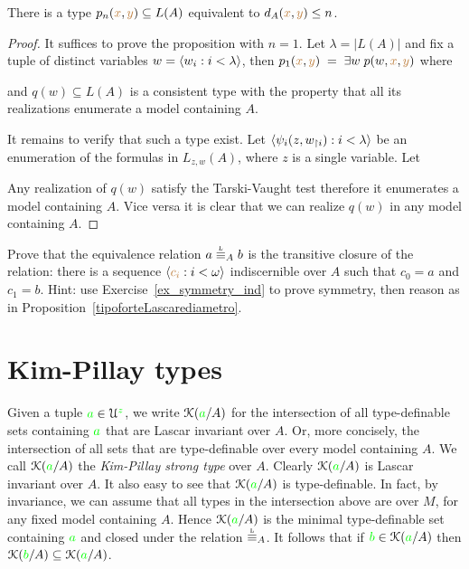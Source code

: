 \begin{proposition}\label{prop_Lascar_distance_type_def}
There is a type $p_n({\color{brown} x},{\color{brown} y})\subseteq L(A)$ equivalent to $d_A({\color{brown} x},{\color{brown} y})\le n$.  
\end{proposition}
\begin{proof}
It suffices to prove the proposition with $n=1$.
Let $\lambda=|L(A)|$ and fix a tuple of distinct variables $w=\langle w_i:i<\lambda\rangle$, then $p_1({\color{brown} x},{\color{brown} y})\;=\;\exists w\;p(w,{\color{brown} x},{\color{brown} y})$ where


and $q(w)\subseteq L(A)$ is a consistent type with the property that all its realizations enumerate a model containing $A$.

It remains to verify that such a type exist.
Let $\langle\psi_i(z,w_{\restriction i}):i<\lambda\rangle$ be an enumeration of the formulas in $L_{z,w}(A)$, where $z$ is a single variable.
Let 


Any realization of $q(w)$ satisfy the Tarski-Vaught test therefore it enumerates a model containing $A$.
Vice versa it is clear that we can realize $q(w)$ in any model containing $A$.
\end{proof}

\begin{exercise}\label{ex_Lstp_indiscernibles}
  Prove that the equivalence relation $a\stackrel{\smash{\scalebox{.5}{\rm L}}}{\equiv}_Ab$ is the transitive closure of the relation: there is a sequence $\langle{\color{brown}c_i}:i<\omega\rangle$ indiscernible over $A$ such that $c_0=a$ and $c_1=b$.
  Hint: use Exercise~\ref{ex_symmetry_ind} to prove symmetry, then reason as in Proposition~\ref{tipoforteLascarediametro}.
\end{exercise}

\section{Kim-Pillay types}\label{KPtypes}

Given a tuple ${\color{green} a}\in\EuScript U^{\color{green} z}$, we write \emph{$\EuScript K({\color{green} a}/A)$\/} for the intersection of all type-definable sets containing ${\color{green} a}$ that are Lascar invariant over $A$.
Or, more concisely, the intersection of all sets that are type-definable over every model containing $A$.
We call $\EuScript K({\color{green} a}/A)$ the \emph{Kim-Pillay strong type\/} over $A$.
Clearly $\EuScript K({\color{green} a}/A)$ is Lascar invariant over $A$.
It also easy to see that $\EuScript K({\color{green} a}/A)$ is type-definable.
In fact, by invariance, we can assume that all types in the intersection above are over $M$, for any fixed model containing $A$.
Hence $\EuScript K({\color{green} a}/A)$ is the minimal type-definable set containing ${\color{green} a}$ and closed under the relation $\equivL_A$.
It follows that if ${\color{green} b}\in\EuScript K({\color{green} a}/A)$ then $\EuScript K({\color{green} b}/A)\subseteq\EuScript K({\color{green} a}/A)$.

